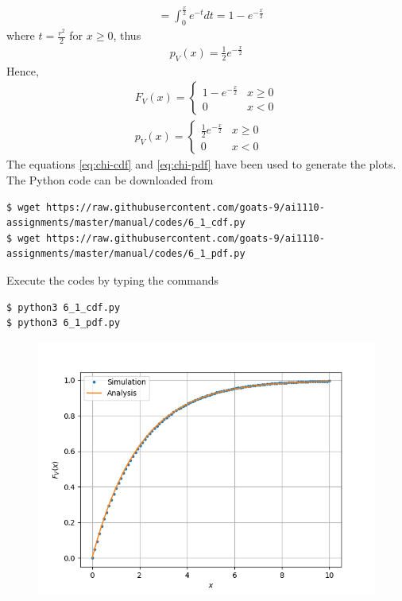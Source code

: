 \documentclass[journal,12pt,twocolumn]{IEEEtran}
\renewcommand\thesection{\arabic{section}}
\begin{document}
\begin{enumerate}[label=\thesection.\arabic*
,ref=\thesection.\theenumi]
\begin{align}
			&= \int_{0}^{\frac{x}{2}}e^{-t}dt = 1 - e^{-\frac{x}{2}}
		\end{align}
where $t = \frac{r^2}{2}$ for $x \geq 0$, thus
		\begin{align}
			p_V(x) = \frac{1}{2}e^{-\frac{x}{2}}
		\end{align}
Hence, 
		\begin{align}
			F_V(x) = 
			\begin{cases}
				1 - e^{-\frac{x}{2}} & x \geq 0 \\
				0 & x < 0 
			\end{cases} \label{eq:chi-cdf} \\
			p_V(x) = 
			\begin{cases}
				\frac{1}{2}e^{-\frac{x}{2}} & x \geq 0 \\
				0 & x < 0
			\end{cases} \label{eq:chi-pdf} 
		\end{align}
The equations \eqref{eq:chi-cdf} and \eqref{eq:chi-pdf} have been used to generate the plots. The Python code can be downloaded from
\begin{lstlisting}
$ wget https://raw.githubusercontent.com/goats-9/ai1110-assignments/master/manual/codes/6_1_cdf.py
$ wget https://raw.githubusercontent.com/goats-9/ai1110-assignments/master/manual/codes/6_1_pdf.py
\end{lstlisting}
Execute the codes by typing the commands
\begin{lstlisting}
$ python3 6_1_cdf.py
$ python3 6_1_pdf.py
\end{lstlisting}
\begin{figure}[!htb]
	\includegraphics[width=\columnwidth]{figs/6_1_cdf.png}

\end{figure}
\end{enumerate}
\end{document}
